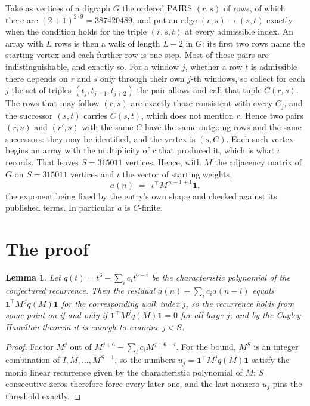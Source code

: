 \documentclass[11pt,a4paper]{article}
\theoremstyle{plain}
\newtheorem{lemma}[theorem]{Lemma}
\theoremstyle{definition}
\begin{document}
Take as vertices of a digraph $G$ the ordered PAIRS $(r,s)$ of rows, of which there are
$(2+1)^{2\cdot9}=387420489$, and put an edge $(r,s)\to(s,t)$ exactly when the condition
holds for the triple $(r,s,t)$ at every admissible index. An array with $L$ rows is then a
walk of length $L-2$ in $G$: its first two rows name the starting vertex and each further
row is one step. Most of those pairs are indistinguishable, and exactly so. For a window $j$, whether a row $t$ is admissible there depends on $r$ and $s$ only through their own $j$-th windows, so collect for each $j$ the set of triples $(t_j,t_{j+1},t_{j+2})$ the pair allows and call that tuple $C(r,s)$. The rows that may follow $(r,s)$ are exactly those consistent with every $C_j$, and the successor $(s,t)$ carries $C(s,t)$, which does not mention $r$. Hence two pairs $(r,s)$ and $(r',s)$ with the same $C$ have the same outgoing rows and the same successors: they may be identified, and the vertex is $(s,C)$. Each such vertex begins an array with the multiplicity of $r$ that produced it, which is what $\iota$ records. That leaves $S=315011$ vertices. Hence, with $M$ the adjacency matrix of $G$ on $S=315011$ vertices and
$\iota$ the vector of starting weights,
\[
a(n)\;=\;\,\iota^{\!\top}M^{\,n-1+1}\mathbf{1},
\]
the exponent being fixed by the entry's own shape and checked against its published terms.
In particular $a$ is $C$-finite.

\section{The proof}

\begin{lemma}\label{lem:crit}
Let $q(t)=t^{6}-\sum_i c_it^{6-i}$ be the characteristic polynomial of the
conjectured recurrence. Then the residual $a(n)-\sum_ic_ia(n-i)$ equals
$\mathbf{1}^{\!\top}M^{\,j}q(M)\mathbf{1}$ for the corresponding walk index
$j$, so the recurrence holds from some point on if and only if
$\mathbf{1}^{\!\top}M^{j}q(M)\mathbf{1}=0$ for all large $j$; and by the
Cayley--Hamilton theorem it is enough to examine $j<S$.
\end{lemma}

\begin{proof}
Factor $M^{j}$ out of $M^{j+6}-\sum_ic_iM^{j+6-i}$. For the bound, $M^{S}$
is an integer combination of $I,M,\dots,M^{S-1}$, so the numbers
$u_j=\mathbf{1}^{\!\top}M^{j}q(M)\mathbf{1}$ satisfy the monic linear recurrence given by
the characteristic polynomial of $M$; $S$ consecutive zeros therefore force every later one,
and the last nonzero $u_j$ pins the threshold exactly.
\end{proof}
\end{document}
